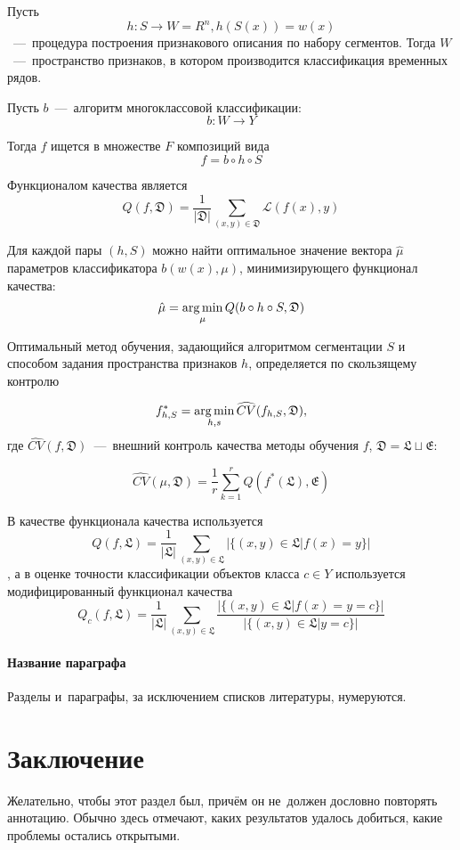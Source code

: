 \documentclass[12pt, twoside]{article}
\begin{document}
Пусть $$h:S\rightarrow W = R^n, h(S(x))=w(x)$$~---~процедура построения признакового описания по набору сегментов. Тогда $W$~---~пространство признаков, в котором производится классификация временных рядов.

Пусть $b$~---~алгоритм многоклассовой классификации: $$b:W\rightarrow Y$$

Тогда $f$ ищется в множестве $F$ композиций вида $$f=b\circ h\circ S$$

Функционалом качества является $$Q(f,\mathfrak{D})=\frac{1}{|\mathfrak{D}|}\sum\limits_{(x,y)\in\mathfrak{D}}\mathscr{L}(f(x),y)$$

Для каждой пары $(h,S)$ можно найти оптимальное значение вектора $\hat\mu$ параметров классификатора $b(w(x),\mu)$, минимизирующего функционал качества: $$\hat\mu=\argmin_\mu Q(b\circ h\circ S,\mathfrak{D})$$

Оптимальный метод обучения, задающийся алгоритмом сегментации $S$ и способом задания пространства признаков $h$, определяется по скользящему контролю

$$f_{h,S}^*=\argmin\limits_{h,s}\widehat{CV}(f_{h,S},\mathfrak{D}),$$ где $\widehat{CV}(f,\mathfrak{D})$~---~внешний контроль качества методы обучения $f$, $\mathfrak{D}=\mathfrak{L}\sqcup\mathfrak{E}$:
 
$$\widehat{CV}(\mu, \mathfrak{D})=\frac{1}{r}\sum\limits_{k=1}^r Q(f^*(\mathfrak{L}),\mathfrak{E})$$

В качестве функционала качества используется $$Q(f,\mathfrak{L})=\frac{1}{|\mathfrak{L}|}\sum\limits_{(x,y)\in\mathfrak{L}}|\{(x,y)\in\mathfrak{L}|f(x)=y\}|$$, а в оценке точности классификации объектов класса $c\in Y$ используется модифицированный функционал качества $$Q_c(f,\mathfrak{L})=\frac{1}{|\mathfrak{L}|}\sum\limits_{(x,y)\in\mathfrak{L}}\frac{|\{(x,y)\in\mathfrak{L}|f(x)=y=c\}|}{|\{(x,y)\in\mathfrak{L}|y=c\}|}$$





\paragraph{Название параграфа}
Разделы и~параграфы, за исключением списков литературы, нумеруются.

\section{Заключение}
Желательно, чтобы этот раздел был, причём он не~должен дословно повторять аннотацию.
Обычно здесь отмечают, каких результатов удалось добиться, какие проблемы остались открытыми.
\end{document}
